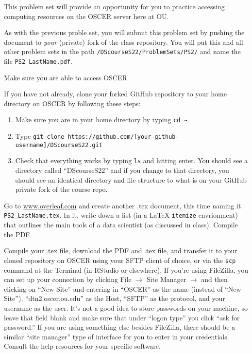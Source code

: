 \documentclass[12pt,english]{exam}
\begin{document}
This problem set will provide an opportunity for you to practice accessing computing resources on the OSCER server here at OU.

As with the previous proble set, you will submit this problem set by pushing the document to \emph{your} (private) fork of the class repository. You will put this and all other problem sets in the path \texttt{/DScourseS22/ProblemSets/PS2/} and name the file \texttt{PS2\_LastName.pdf}.
\begin{questions}
\question Make sure you are able to access OSCER.

\question If you have not already, clone your forked GitHub repository to your home directory on OSCER by following these steps:
\begin{enumerate}
	\item Make sure you are in your home directory by typing \texttt{cd \~}.
	\item Type \texttt{git clone https://github.com/[your-github-username]/DScourseS22.git}
	\item Check that everything works by typing \texttt{ls} and hitting enter. You should see a directory called ``DScourseS22'' and if you change to that directory, you should see an identical directory and file structure to what is on your GitHub private fork of the course repo.
\end{enumerate}

\question Go to \url{www.overleaf.com} and create another .tex document, this time naming it \texttt{PS2\_LastName.tex}. In it, write down a list (in a LaTeX \texttt{itemize} envrionment) that outlines the main tools of a data scientist (as discussed in class). Compile the PDF.

\question Compile your .tex file, download the PDF and .tex file, and transfer it to your cloned repository on OSCER using your SFTP client of choice, or via the \texttt{scp} command at the Terminal (in RStudio or elsewhere). If you're using FileZilla, you can set up your connection by clicking File $\rightarrow$ Site Manager $\rightarrow$ and then clicking on ``New Site'' and entering in ``OSCER'' as the name (instead of ``New Site''), ``dtn2.oscer.ou.edu'' as the Host, ``SFTP'' as the protocol, and your username as the user. It's not a good idea to store passwords on your machine, so leave that field blank and make sure that under ``logon type'' you click ``ask for password.'' If you are using something else besides FileZilla, there should be a similar ``site manager'' type of interface for you to enter in your credentials. Consult the help resources for your specific software.


\end{questions}
\end{document}
